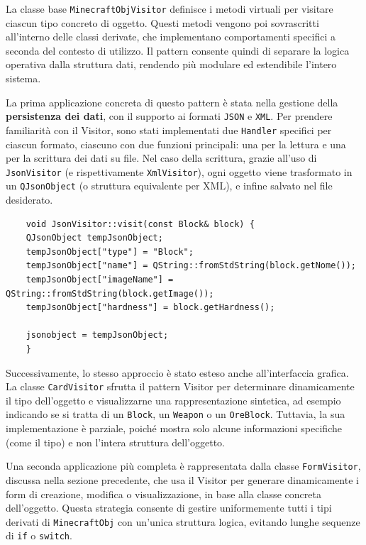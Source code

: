 \documentclass[12pt]{article}
\begin{document}
La classe base \texttt{MinecraftObjVisitor} definisce i metodi virtuali per visitare ciascun tipo concreto di oggetto. Questi metodi vengono poi sovrascritti all'interno delle classi derivate, che implementano comportamenti specifici a seconda del contesto di utilizzo.  
Il pattern consente quindi di separare la logica operativa dalla struttura dati, rendendo più modulare ed estendibile l’intero sistema.

La prima applicazione concreta di questo pattern è stata nella gestione della \textbf{persistenza dei dati}, con il supporto ai formati \texttt{JSON} e \texttt{XML}.  
Per prendere familiarità con il Visitor, sono stati implementati due \texttt{Handler} specifici per ciascun formato, ciascuno con due funzioni principali: una per la lettura e una per la scrittura dei dati su file.  
Nel caso della scrittura, grazie all’uso di \texttt{JsonVisitor} (e rispettivamente \texttt{XmlVisitor}), ogni oggetto viene trasformato in un \texttt{QJsonObject} (o struttura equivalente per XML), e infine salvato nel file desiderato.

\begin{lstlisting}
    void JsonVisitor::visit(const Block& block) {
    QJsonObject tempJsonObject;
    tempJsonObject["type"] = "Block";
    tempJsonObject["name"] = QString::fromStdString(block.getNome());
    tempJsonObject["imageName"] = QString::fromStdString(block.getImage());
    tempJsonObject["hardness"] = block.getHardness();
    
    jsonobject = tempJsonObject;
    }
\end{lstlisting}

Successivamente, lo stesso approccio è stato esteso anche all'interfaccia grafica.  
La classe \texttt{CardVisitor} sfrutta il pattern Visitor per determinare dinamicamente il tipo dell’oggetto e visualizzarne una rappresentazione sintetica, ad esempio indicando se si tratta di un \texttt{Block}, un \texttt{Weapon} o un \texttt{OreBlock}.  
Tuttavia, la sua implementazione è parziale, poiché mostra solo alcune informazioni specifiche (come il tipo) e non l'intera struttura dell’oggetto.

Una seconda applicazione più completa è rappresentata dalla classe \texttt{FormVisitor}, discussa nella sezione precedente, che usa il Visitor per generare dinamicamente i form di creazione, modifica o visualizzazione, in base alla classe concreta dell’oggetto.  
Questa strategia consente di gestire uniformemente tutti i tipi derivati di \texttt{MinecraftObj} con un'unica struttura logica, evitando lunghe sequenze di \texttt{if} o \texttt{switch}.
\end{document}
